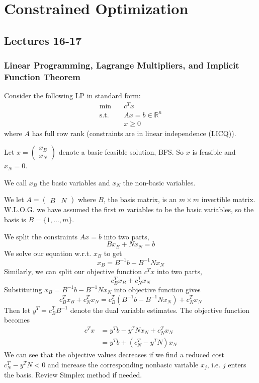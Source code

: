 \newpage
\section{Constrained Optimization}
\subsection{Lectures 16-17}
\subsubsection{Linear Programming, Lagrange Multipliers, and Implicit Function Theorem}
\begin{example}
    Consider the following LP in standard form:
    \begin{align*}
        \min \quad & c^T x \\
        \text{s.t.} \quad & Ax = b \in \mathbb R^n\\
        & x \geq 0
    \end{align*}
    where $A$ has full row rank (constraints are in linear independence (LICQ)).

    Let $x = \begin{pmatrix}x_B \\ x_N \end{pmatrix}$ denote a basic feasible solution, BFS. So $x$ is feasible and $x_N = 0$. 
    
    We call $x_B$ the basic variables and $x_N$ the non-basic variables. 
    
    We let $A = \begin{pmatrix}B & N\end{pmatrix}$ where $B$, the basis matrix, is an $m \times m$ invertible matrix. W.L.O.G. we have assumed the first $m$ variables to be the basic variables, so the basis is $B = \{1,\ldots,m\}$.

    We split the constraints $Ax = b$ into two parts, $$Bx_B + Nx_N = b$$ 
    We solve our equation w.r.t. $x_B$ to get $$x_B = B^{-1}b - B^{-1}Nx_N$$
    Similarly, we can split our objective function $c^T x$ into two parts, $$c^T_B x_B + c^T_N x_N$$ Substituting $x_B = B^{-1}b - B^{-1}Nx_N$ into objective function gives
    $$c^T_B x_B + c^T_N x_N = c^T_B(B^{-1}b - B^{-1}Nx_N) + c^T_N x_N$$
    Then let $y^T = c^T_BB^{-1}$ denote the dual variable estimates. The objective function becomes
    \begin{align*}
        c^Tx &= y^Tb - y^TNx_N + c^T_Nx_N \\
        &= y^Tb + (c^T_N - y^TN)x_N
    \end{align*}
    We can see that the objective values decreases if we find a reduced cost $c^T_N - y^TN < 0$ and increase the corresponding nonbasic variable $x_j$, i.e. $j$ enters the basis. Review Simplex method if needed.
\end{example}
